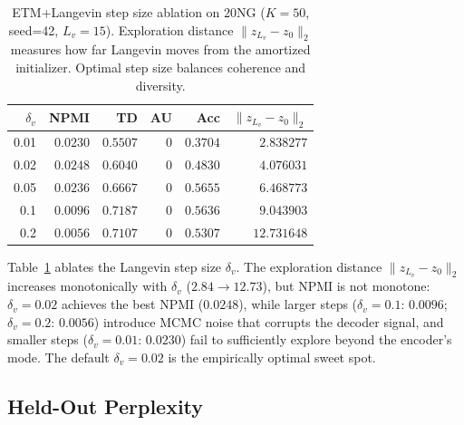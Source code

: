 \documentclass[10pt]{article}
\begin{document}
\begin{table}[t]
\centering
\caption{ETM+Langevin step size ablation on 20NG ($K=50$, seed=42, $L_v=15$).
Exploration distance $\|z_{L_v} - z_0\|_2$ measures how far Langevin moves from the
amortized initializer. Optimal step size balances coherence and diversity.}
\label{tab:stepsize}
\small
\begin{tabular}{rrrrrr}
\hline
$\delta_v$ & \textbf{NPMI} & \textbf{TD} & \textbf{AU} & \textbf{Acc} & $\|z_{L_v}-z_0\|_2$ \\
\hline
  0.01 & $0.0230$ & $0.5507$ & 0 & $0.3704$ & $2.838277$ \\
  0.02 & $0.0248$ & $0.6040$ & 0 & $0.4830$ & $4.076031$ \\
  0.05 & $0.0236$ & $0.6667$ & 0 & $0.5655$ & $6.468773$ \\
  0.1 & $0.0096$ & $0.7187$ & 0 & $0.5636$ & $9.043903$ \\
  0.2 & $0.0056$ & $0.7107$ & 0 & $0.5307$ & $12.731648$ \\
\hline
\end{tabular}
\end{table}

Table~\ref{tab:stepsize} ablates the Langevin step size $\delta_v$.
The exploration distance $\|z_{L_v} - z_0\|_2$ increases monotonically with $\delta_v$
($2.84 \to 12.73$), but NPMI is not monotone:
$\delta_v{=}0.02$ achieves the best NPMI ($0.0248$), while larger steps
($\delta_v{=}0.1$: $0.0096$; $\delta_v{=}0.2$: $0.0056$) introduce MCMC noise
that corrupts the decoder signal, and smaller steps ($\delta_v{=}0.01$: $0.0230$)
fail to sufficiently explore beyond the encoder's mode.
The default $\delta_v = 0.02$ is the empirically optimal sweet spot.

\subsection{Held-Out Perplexity}
\label{sec:ppl}
\end{document}
